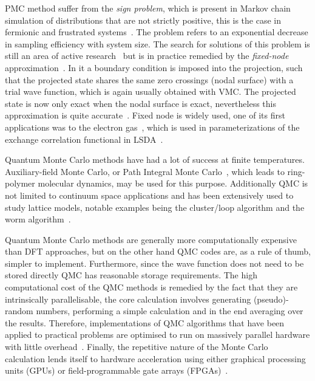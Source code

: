\documentclass[final,3p,times,twocolumn]{elsarticle}
\begin{document}
		PMC method suffer from the \emph{sign problem}, which is present in Markov chain simulation of distributions that are not strictly positive, this is the case in fermionic and frustrated systems~\cite{gubernatis_kawashima_werner_2016}. The problem refers to an exponential decrease in sampling efficiency with system size. The search for solutions of this problem is still an area of active research~\cite{foulkes2001quantum} but is in practice remedied by the \emph{fixed-node} approximation~\cite{anderson1975random}. In it a boundary condition is imposed into the projection, such that the projected state shares the same zero crossings (nodal surface) with a trial wave function, which is again usually obtained with VMC. The projected state is now only exact when the nodal surface is exact, nevertheless this approximation is quite accurate~\cite{foulkes2001quantum}. Fixed node is widely used, one of its first applications was to the electron gas~\cite{ceperley1980ground}, which is used in parameterizations of the  exchange correlation functional in LSDA~\cite{vosko1980accurate}.
	
		Quantum Monte Carlo methods have had a lot of success at finite temperatures. Auxiliary-field Monte Carlo, or Path Integral Monte Carlo~\cite{ceperley1995path}, which leads to ring-polymer molecular dynamics, may be used for this purpose. Additionally QMC is not limited to continuum space applications and has been extensively used to study lattice models, notable examples being the cluster/loop algorithm and the worm algorithm~\cite{gubernatis_kawashima_werner_2016, prokof1998exact}.
	
		Quantum Monte Carlo methods are generally more computationally expensive than DFT approaches, but on the other hand QMC codes are, as a rule of thumb, simpler to implement. Furthermore, since the wave function does not need to be stored directly QMC has reasonable storage requirements. The high computational cost of the QMC methods is remedied by the fact that they are intrinsically parallelisable, the core calculation involves generating (pseudo)-random numbers, performing a simple calculation and in the end averaging over the results. Therefore, implementations of QMC algorithms that have been applied to practical problems are optimised to run on massively parallel hardware with little overhead~\cite{needs2020variational}. Finally, the repetitive nature of the Monte Carlo calculation lends itself to hardware acceleration using either graphical processing units (GPUs) or field-programmable gate arrays (FPGAs)~\cite{austin2012quantum}.
		
\end{document}
